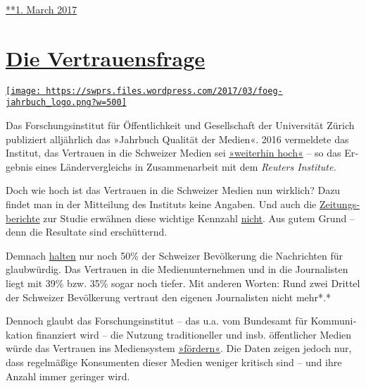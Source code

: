 \href{https://swprs.org/2017/03/01/der-schweizer-presserat/}{**1. March
2017}

\hypertarget{die-vertrauensfrage}{%
\section{\texorpdfstring{\href{https://swprs.org/2017/03/01/schweizer-medien-vertrauen/}{Die
Vertrauensfrage}}{Die Vertrauensfrage}}\label{die-vertrauensfrage}}

\href{https://swprs.org/2017/03/01/schweizer-medien-vertrauen/}{\texttt{[image: https://swprs.files.wordpress.com/2017/03/foeg-jahrbuch\_logo.png?w=500]}}

Das Forschungs­institut für Öf­fent­lich­­keit und Gesell­schaft der
Uni­ver­sität Zürich publi­ziert all­jähr­lich das »Jahr­buch Qualität
der Medien«. 2016 ver­mel­dete das In­sti­tut, das Ver­trau­en in die
Schwei­zer Me­dien sei
\href{http://www.foeg.uzh.ch/dam/jcr:7234c6d3-1f09-4d36-b6ab-f14e659d046e/Medienmitteilung_JB_2016_dt.pdf}{»weiter­hin
hoch«} -- so das Er­geb­nis eines Länder­ver­gleichs in
Zu­sam­men­ar­beit mit dem \emph{\emph{Reu­ters Insti­tute.}}

Doch wie hoch ist das Vertrauen in die Schweizer Medien nun wirklich?
Dazu findet man in der Mit­tei­lung des Instituts keine An­ga­ben. Und
auch die
\href{http://www.tagesanzeiger.ch/schweiz/standard/Diese-Menschen-sind-anfaellig-fuer-Populisten/story/23804017}{Zei­tungs­be­richte}
zur Studie er­wäh­nen diese wich­tige Kenn­zahl
\href{http://www.nzz.ch/schweiz/analyse-zum-medienvertrauen-oeffentliche-medien-staerken-auch-die-privaten-ld.128965}{nicht}.
Aus gutem Grund -- denn die Resultate sind er­schüt­ternd.

Demnach
\href{http://media.digitalnewsreport.org/wp-content/uploads/2018/11/Digital-News-Report-2016.pdf\#page=60}{halten}
nur noch 50\% der Schwei­zer Be­völ­ke­rung die Nach­rich­ten für
glaub­würdig. Das Ver­trauen in die Medien­unter­nehmen und in die
Jour­na­listen liegt mit 39\% bzw. 35\% sogar noch tiefer. Mit anderen
Worten: Rund zwei Drittel der Schweizer Be­völ­ke­rung ver­traut den
ei­ge­nen Jour­na­listen nicht mehr*.*

Dennoch glaubt das For­schungs­in­sti­tut -- das u.a. vom Bundes­amt für
Kom­mu­ni­ka­tion finanziert wird -- die Nutzung tra­di­tio­neller und
ins­b. öffent­licher Medien würde das Ver­trauen ins Medien­system
\href{http://www.foeg.uzh.ch/dam/jcr:7234c6d3-1f09-4d36-b6ab-f14e659d046e/Medienmitteilung_JB_2016_dt.pdf}{»för­dern«}.
Die Da­ten zei­gen je­doch nur, dass regel­mäßige Kon­su­menten die­ser
Me­dien we­ni­ger kri­tisch sind -- und ihre An­zahl immer ge­ringer
wird.

